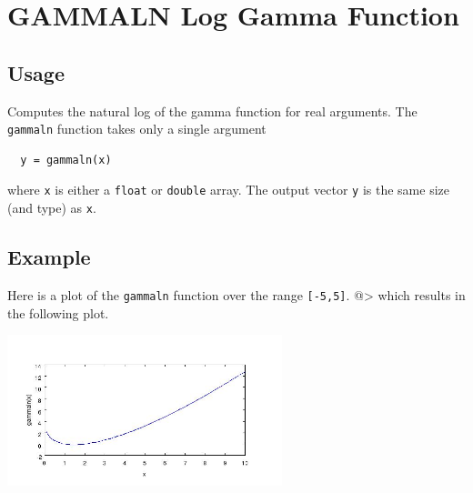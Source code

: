 \section{GAMMALN Log Gamma Function}

\subsection{Usage}

Computes the natural log of the gamma function for real arguments.  The \verb|gammaln|
function takes only a single argument
\begin{verbatim}
  y = gammaln(x)
\end{verbatim}
where \verb|x| is either a \verb|float| or \verb|double| array.  The output
vector \verb|y| is the same size (and type) as \verb|x|.
\subsection{Example}

Here is a plot of the \verb|gammaln| function over the range \verb|[-5,5]|.
@>
which results in the following plot.


\centerline{\includegraphics[width=8cm]{gammaln1}}


